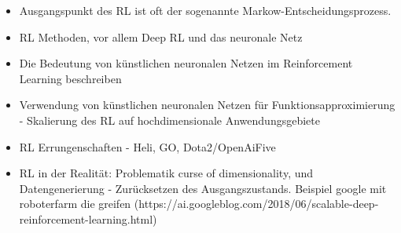\begin{itemize}
\item Ausgangspunkt des RL ist oft der sogenannte Markow-Entscheidungsprozess. 

\item RL Methoden, vor allem Deep RL und das neuronale Netz

\item Die Bedeutung von künstlichen neuronalen Netzen im Reinforcement Learning beschreiben

\item Verwendung von künstlichen neuronalen Netzen für Funktionsapproximierung - Skalierung des RL auf hochdimensionale Anwendungsgebiete

\item RL Errungenschaften - Heli, GO, Dota2/OpenAiFive

\item RL in der Realität: Problematik curse of dimensionality, und Datengenerierung - Zurücksetzen des Ausgangszustands. Beispiel google mit roboterfarm die greifen (https://ai.googleblog.com/2018/06/scalable-deep-reinforcement-learning.html)

\end{itemize}




